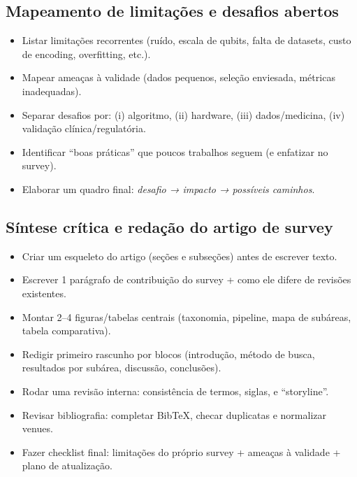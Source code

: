 \documentclass[11pt]{article}
\begin{document}
\subsection{Mapeamento de limitações e desafios abertos}
\begin{itemize}
  \item [ ] Listar limitações recorrentes (ruído, escala de qubits, falta de datasets, custo de encoding, overfitting, etc.).
  \item [ ] Mapear ameaças à validade (dados pequenos, seleção enviesada, métricas inadequadas).
  \item [ ] Separar desafios por: (i) algoritmo, (ii) hardware, (iii) dados/medicina, (iv) validação clínica/regulatória.
  \item [ ] Identificar ``boas práticas'' que poucos trabalhos seguem (e enfatizar no survey).
  \item [ ] Elaborar um quadro final: \emph{desafio → impacto → possíveis caminhos}.
\end{itemize}

\subsection{Síntese crítica e redação do artigo de survey}
\begin{itemize}
  \item [ ] Criar um esqueleto do artigo (seções e subseções) antes de escrever texto.
  \item [ ] Escrever 1 parágrafo de contribuição do survey + como ele difere de revisões existentes.
  \item [ ] Montar 2--4 figuras/tabelas centrais (taxonomia, pipeline, mapa de subáreas, tabela comparativa).
  \item [ ] Redigir primeiro rascunho por blocos (introdução, método de busca, resultados por subárea, discussão, conclusões).
  \item [ ] Rodar uma revisão interna: consistência de termos, siglas, e ``storyline''.
  \item [ ] Revisar bibliografia: completar Bib\TeX{}, checar duplicatas e normalizar venues.
  \item [ ] Fazer checklist final: limitações do próprio survey + ameaças à validade + plano de atualização.
\end{itemize}
\end{document}
